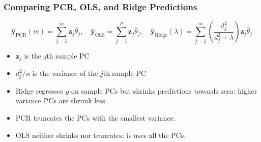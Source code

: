 \begin{frame}
  \frametitle{Comparing PCR, OLS, and Ridge Predictions}
  
  \small

  \[
        \widehat{\mathbf{y}}_{\text{PCR}}(m) =\sum_{j = 1}^m \mathbf{z}_j\widehat{\theta}_j, \quad
    \widehat{\mathbf{y}}_{\text{OLS}} = \sum_{j=1}^p \mathbf{z}_j \widehat{\theta}_j, \quad
        \widehat{\mathbf{y}}_{\text{Ridge}}(\lambda) = \sum_{j=1}^m \left( \frac{d_j^2}{d_j^2 + \lambda} \right) \mathbf{z}_j \widehat{\theta}_j
  \]

  \begin{itemize}
    \item $\mathbf{z}_j$ is the $j$th sample PC
    \item $d_j^2/n$ is the variance of the $j$th sample PC
    \item Ridge regresses $y$ on sample PCs but \alert{shrinks} predictions towards zero: higher variance PCs are shrunk \alert{less}.
    \item PCR \alert{truncates} the PCs with the smallest variance. 
    \item OLS neither shrinks nor truncates: is uses all the PCs. 
  \end{itemize}

\end{frame}
%
%
